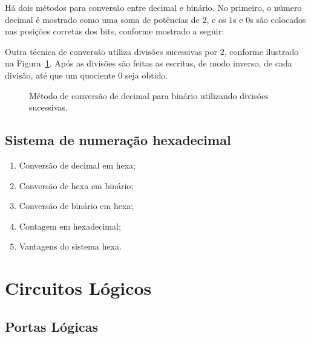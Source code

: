 Há dois métodos para conversão entre decimal e binário. No primeiro, o
número decimal é mostrado como uma soma de potências de $2$, e os $1$s
e $0$s são colocados nas posições corretas dos bits, conforme mostrado
a seguir:




\bigskip
Outra técnica de conversão utiliza divisões sucessivas por $2$,
conforme ilustrado na Figura~\ref{fig:dec2bin}. Após as divisões são
feitas as escritas, de modo inverso, de cada divisão, até que um
quociente $0$ seja obtido.

\begin{figure}[ht]
  

  \label{fig:dec2bin}
  \caption{Método de conversão de decimal para binário utilizando divisões
    sucessivas.}
\end{figure}


\subsection[sec:num:hex]{Sistema de numeração hexadecimal}


\begin{enumerate}
\item Conversão de decimal em hexa;
\item Conversão de hexa em binário;
\item Conversão de binário em hexa;
\item Contagem em hexadecimal;
\item Vantagens do sistema hexa.
\end{enumerate}


\section{Circuitos Lógicos}
\label{ch:log-circ}


\subsection{Portas Lógicas}
\label{sec:gates}

